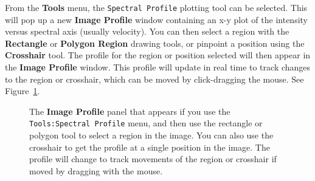 From the {\bf Tools} menu, the {\tt Spectral Profile} plotting
tool can be selected.  This will pop up a new {\bf Image Profile}
window containing an x-y plot of the intensity versus spectral
axis (usually velocity).  You can then select a region with the
{\bf Rectangle} or {\bf Polygon Region} drawing tools, or pinpoint
a position using the {\bf Crosshair} tool.  The profile
for the region or position selected will then appear in the
{\bf Image Profile} window.  This profile will update in real time
to track changes to the region or crosshair, which can be moved
by click-dragging the mouse.  See Figure~\ref{fig:viewer_specprof}.

\begin{figure}[h!]
\begin{center}
\caption{\label{fig:viewer_specprof} The {\bf Image Profile} panel
that appears if you use the {\tt Tools:Spectral Profile} menu,
and then use the rectangle or polygon tool to select a region in the image.
You can also use the crosshair to get the profile at a single
position in the image.  The profile will change to track movements
of the region or crosshair if moved by dragging with the mouse.} 
\hrulefill
\end{center}
\end{figure}




% 

